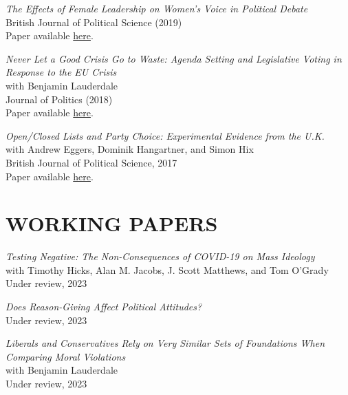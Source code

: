 \documentclass[centered]{res}
\begin{document}
\begin{resume}
{\sl The Effects of Female Leadership on Women's Voice in Political Debate} \\
British Journal of Political Science (2019) \\
Paper available \href{https://www.cambridge.org/core/journals/british-journal-of-political-science/article/effects-of-female-leadership-on-womens-voice-in-political-debate/146CC7A7C2965ACBEC82BC328BD2D5F2} {here}.

{\sl Never Let a Good Crisis Go to Waste: Agenda Setting and Legislative Voting in Response to the EU Crisis} \\
with Benjamin Lauderdale\\
Journal of Politics (2018)\\
Paper available \href{https://www.journals.uchicago.edu/doi/abs/10.1086/694543} {here}.


{\sl Open/Closed Lists and Party Choice: Experimental Evidence from the U.K.}\\with Andrew Eggers, Dominik Hangartner, and Simon Hix \\
British Journal of Political Science, 2017\\
Paper available \href{http://journals.cambridge.org/action/displayFulltext?type=1&fid=10345643&jid=JPS&volumeId=-1&issueId=-1&aid=10345638} {here}.



\section{WORKING PAPERS} 


{\sl Testing Negative: The Non-Consequences of COVID-19 on Mass Ideology} \\
with Timothy Hicks, Alan M. Jacobs, J. Scott Matthews, and Tom O'Grady \\
Under review, 2023 

{\sl Does Reason-Giving Affect Political Attitudes?} \\
Under review, 2023

{\sl Liberals and Conservatives Rely on Very Similar Sets of Foundations When Comparing Moral Violations} \\
with Benjamin Lauderdale \\
Under review, 2023


\end{resume}
\end{document}
